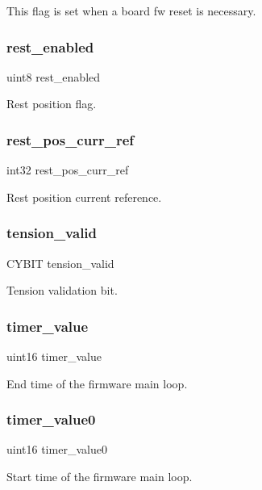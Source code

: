 This flag is set when a board fw reset is necessary. \mbox{\label{globals_8h_a1f8839fadee52a47a0042eaa695c3f3a}} 
\subsubsection{rest\+\_\+enabled}
{\footnotesize\ttfamily uint8 rest\+\_\+enabled}

Rest position flag. \mbox{\label{globals_8h_a485e5b90bbfb79aa97f874873cd6c93a}} 
\subsubsection{rest\+\_\+pos\+\_\+curr\+\_\+ref}
{\footnotesize\ttfamily int32 rest\+\_\+pos\+\_\+curr\+\_\+ref}

Rest position current reference. \mbox{\label{globals_8h_ac42fa606610c2600210d9b7b2c1d0882}} 
\subsubsection{tension\+\_\+valid}
{\footnotesize\ttfamily C\+Y\+B\+IT tension\+\_\+valid}

Tension validation bit. \mbox{\label{globals_8h_a2c95347784600e4a45d481b37eeeef4b}} 
\subsubsection{timer\+\_\+value}
{\footnotesize\ttfamily uint16 timer\+\_\+value}

End time of the firmware main loop. \mbox{\label{globals_8h_a82c5883d1d4a600a1073686f917a812d}} 
\subsubsection{timer\+\_\+value0}
{\footnotesize\ttfamily uint16 timer\+\_\+value0}

Start time of the firmware main loop. 